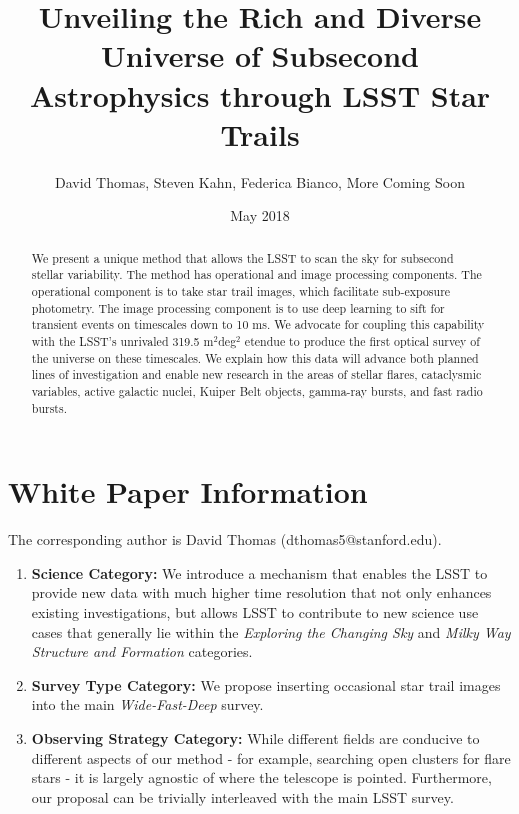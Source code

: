 \documentclass[12pt, letterpaper]{article}
\title{Unveiling the Rich and Diverse Universe of Subsecond Astrophysics through LSST Star Trails}
\author{David Thomas, Steven Kahn, Federica Bianco, {\color{green}More Coming Soon}}
\date{May 2018}
\begin{document}
\maketitle

\begin{abstract}
We present a unique method that allows the LSST to scan the sky for subsecond stellar variability. The method has operational and image processing components. The operational component is to take star trail images, which facilitate sub-exposure photometry. The image processing component is to use deep learning to sift for transient events on timescales down to 10 ms. We advocate for coupling this capability with the LSST's unrivaled 319.5 m$^2$deg$^2$ etendue to produce the first optical survey of the universe on these timescales. We explain how this data will advance both planned lines of investigation and enable new research in the areas of stellar flares, cataclysmic variables, active galactic nuclei, Kuiper Belt objects, gamma-ray bursts, and fast radio bursts.
\end{abstract}

\section{White Paper Information}
The corresponding author is David Thomas (dthomas5@stanford.edu).

\begin{enumerate} 
\item {\bf Science Category:} We introduce a mechanism that enables the LSST to provide new data with much higher time resolution that not only enhances existing investigations, but allows LSST to contribute to new science use cases that generally lie within the \textit{Exploring the Changing Sky} and \textit{Milky Way Structure and Formation} categories.

\item {\bf Survey Type Category:} We propose inserting occasional star trail images into the main \textit{Wide-Fast-Deep} survey.

\item {\bf Observing Strategy Category:}
While different fields are conducive to different aspects of our method - for example, searching open clusters for flare stars - it is largely agnostic of where the telescope is pointed. Furthermore, our proposal can be trivially interleaved with the main LSST survey.

\end{enumerate}  
\end{document}
